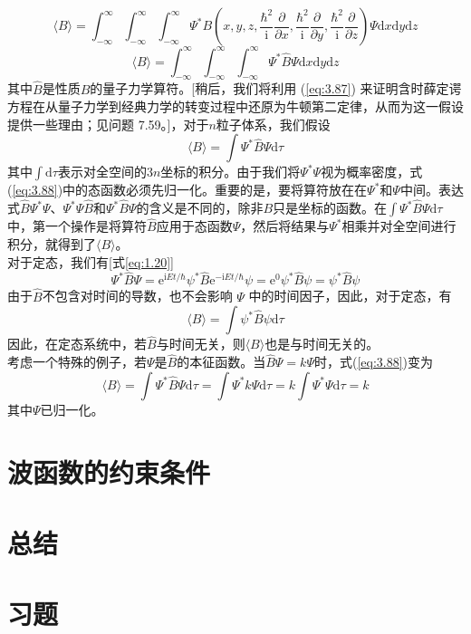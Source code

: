 	\begin{equation*}
		\langle B \rangle = \int_{-\infty}^{\infty}\int_{-\infty}^{\infty}\int_{-\infty}^{\infty}\Psi^{\ast}B\left(x,y,z,\frac{\hbar^2}{\mathrm{i}}\frac{\partial}{\partial x},\frac{\hbar^2}{\mathrm{i}}\frac{\partial}{\partial y},\frac{\hbar^2}{\mathrm{i}}\frac{\partial}{\partial z}\right)\Psi\mathrm{d}x\mathrm{d}y\mathrm{d}z
	\end{equation*}
	\begin{equation}
		\langle B \rangle = \int_{-\infty}^{\infty}\int_{-\infty}^{\infty}\int_{-\infty}^{\infty}\Psi^{\ast}\hat{B}\Psi\mathrm{d}x\mathrm{d}y\mathrm{d}z
		\label{eq:3.87}
	\end{equation}
	其中$\hat{B}$是性质$B$的量子力学算符。[稍后，我们将利用 (\ref{eq:3.87}) 来证明含时薛定谔方程在从量子力学到经典力学的转变过程中还原为牛顿第二定律，从而为这一假设提供一些理由；见问题 7.59。]，对于$n$粒子体系，我们假设
	\begin{equation}
		\boxed{
			\langle B \rangle = \int \Psi^{\ast}\hat{B}\Psi\mathrm{d}\tau
		}
		\label{eq:3.88}
	\end{equation}
	其中$\int\mathrm{d}\tau$表示对全空间的$3n$坐标的积分。由于我们将$\Psi^{\ast}\Psi$视为概率密度，式(\ref{eq:3.88})中的态函数必须先归一化。重要的是，要将算符放在在$\Psi^{\ast}$和$\Psi$中间。表达式$\hat{B}\Psi^{\ast}\Psi$、$\Psi^{\ast}\Psi\hat{B}$和$\Psi^{\ast}\hat{B}\Psi$的含义是不同的，除非$B$只是坐标的函数。在$\int\Psi^{\ast}\hat{B}\Psi\mathrm{d}\tau$中，第一个操作是将算符$\hat{B}$应用于态函数$\Psi$，然后将结果与$\Psi^{\ast}$相乘并对全空间进行积分，就得到了$\langle B \rangle$。\\
	\indent 对于定态，我们有[式\ref{eq:1.20}]
	\begin{equation*}
		\Psi^{\ast}\hat{B}\Psi = \mathrm{e}^{\mathrm{i}Et/\hbar}\psi^{\ast}\hat{B}\mathrm{e}^{-\mathrm{i}Et/\hbar}\psi = \mathrm{e}^{0}\psi^{\ast}\hat{B}\psi = \psi^{\ast}\hat{B}\psi
	\end{equation*}
	由于$\hat{B}$不包含对时间的导数，也不会影响 $\Psi$ 中的时间因子，因此，对于定态，有
	\begin{equation}
		\langle B \rangle = \int \psi^{\ast}\hat{B}\psi\mathrm{d}\tau
		\label{eq:3.89}
	\end{equation}
	因此，在定态系统中，若$\hat{B}$与时间无关，则$\langle B \rangle$也是与时间无关的。\\
	\indent 考虑一个特殊的例子，若$\Psi$是$\hat{B}$的本征函数。当$\hat{B}\Psi = k\Psi$时，式(\ref{eq:3.88})变为
	\begin{equation}
		\langle B \rangle = \int \Psi^{\ast}\hat{B}\Psi\mathrm{d}\tau = \int \Psi^{\ast}k\Psi\mathrm{d}\tau = k \int \Psi^{\ast}\Psi\mathrm{d}\tau = k
		\label{eq:3.90}
	\end{equation}
	其中$\Psi$已归一化。

\section{波函数的约束条件}

\section*{总结}

\section*{习题}